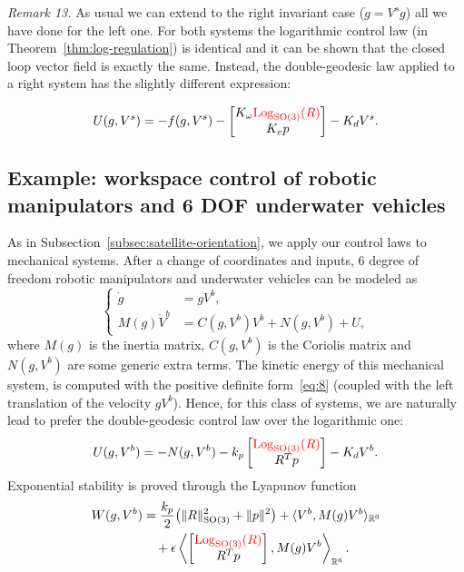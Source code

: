 \documentclass[10pt,twocolumn]{article}
\newcommand{\rev}[1]{\textcolor{red}{#1}}
\newcommand{\Log}{\operatorname{Log}}
\newcommand{\SO}{\mathrm{SO}}
\newcommand{\R}{\mathbb R}
\newcounter{paperitem}
\newcommand{\paperhead}[3]{\refstepcounter{paperitem}\par\medskip\noindent\textit{#1}\label{#3} #2\par}
\begin{document}
\paperhead{Remark 13.}{As usual we can extend to the right invariant case ($\dot g=V^s g$) all we have done for the left one. For both systems the logarithmic control law (in Theorem~\ref{thm:log-regulation}) is identical and it can be shown that the closed loop vector field is exactly the same. Instead, the double-geodesic law applied to a right system has the slightly different expression:}{rem:right-invariant}
\begin{equation*}
U(g,V^s)=-f(g,V^s)-
\begin{bmatrix}
K_\omega\rev{\Log_{\SO(3)}(R)}\\
K_vp
\end{bmatrix}-K_dV^s.
\end{equation*}

\subsection{Example: workspace control of robotic manipulators and 6 DOF underwater vehicles}\label{subsec:workspace-control}
As in Subsection~\ref{subsec:satellite-orientation}, we apply our control laws to mechanical systems. After a change of coordinates and inputs, 6 degree of freedom robotic manipulators and underwater vehicles can be modeled as
\begin{equation*}
\left\{\begin{aligned}
\dot g&=gV^b,\\
M(g)\dot V^b&=C(g,V^b)V^b+N(g,V^b)+U,
\end{aligned}\right.
\end{equation*}
where $M(g)$ is the inertia matrix, $C(g,V^b)$ is the Coriolis matrix and $N(g,V^b)$ are some generic extra terms. The kinetic energy of this mechanical system, is computed with the positive definite form~\eqref{eq:8} (coupled with the left translation of the velocity $gV^b$). Hence, for this class of systems, we are naturally lead to prefer the double-geodesic control law over the logarithmic one:
\begin{equation*}
U(g,V^b)=-N(g,V^b)-k_p
\begin{bmatrix}
\rev{\Log_{\SO(3)}(R)}\\
R^Tp
\end{bmatrix}-K_dV^b.
\end{equation*}
Exponential stability is proved through the Lyapunov function
\begin{align*}
W(g,V^b)&=\frac{k_p}{2}\bigl(\|R\|_{\SO(3)}^2+\|p\|^2\bigr)
+\langle V^b,M(g)V^b\rangle_{\R^6}\\
&\quad+\epsilon\left\langle
\begin{bmatrix}\rev{\Log_{\SO(3)}(R)}\\R^Tp\end{bmatrix},
M(g)V^b
\right\rangle_{\R^6}.
\end{align*}
\end{document}
